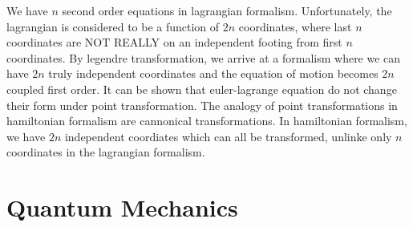 \documentclass{report}
\begin{document}
We have $n$ second order equations in lagrangian formalism. Unfortunately, the lagrangian is considered to be a function of $2n$ coordinates, where last $n$ coordinates are NOT REALLY on an independent footing from first $n$ coordinates. By legendre transformation, we arrive at a formalism where we can have $2n$ truly independent coordinates and the equation of motion becomes $2n$ coupled first order. It can be shown that euler-lagrange equation do not change their form under point transformation. The analogy of point transformations in hamiltonian formalism are cannonical transformations. In hamiltonian formalism, we have $2n$ independent coordiates which can all be transformed, unlinke only $n$ coordinates in the lagrangian formalism.

\chapter{Quantum Mechanics}
\end{document}
